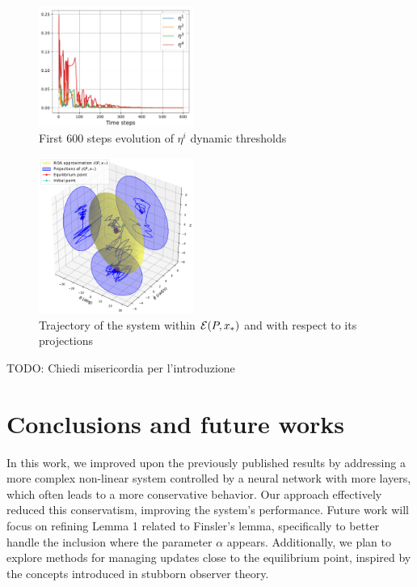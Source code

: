 \documentclass{ifacconf}
\theoremstyle{plain}
\begin{document}
\begin{figure}[H]
    \centering
    \includegraphics[width=0.45\textwidth]{Figures/eta_plot}
    \caption{First $600$ steps evolution of $\eta^i$ dynamic thresholds}
    \label{fig:eta}
\end{figure}

\begin{figure}[H]
    \centering
    \includegraphics[width=0.45\textwidth]{Figures/ellipsoid_plot}
    \caption{Trajectory of the system within ${\mathcal{E}}(P, x_*)$ and with respect to its projections}
    \label{fig:ellipsoid}
\end{figure}


{\color{red} TODO: Chiedi misericordia per l'introduzione}

\section{Conclusions and future works}
In this work, we improved upon the previously published results by addressing a more complex non-linear system controlled by a neural network with more layers, which often leads to a more conservative behavior. Our approach effectively reduced this conservatism, improving the system's performance. Future work will focus on refining Lemma 1 related to Finsler's lemma, specifically to better handle the inclusion where the parameter $\alpha$ appears. Additionally, we plan to explore methods for managing updates close to the equilibrium point, inspired by the concepts introduced in stubborn observer theory.

%

\end{document}
